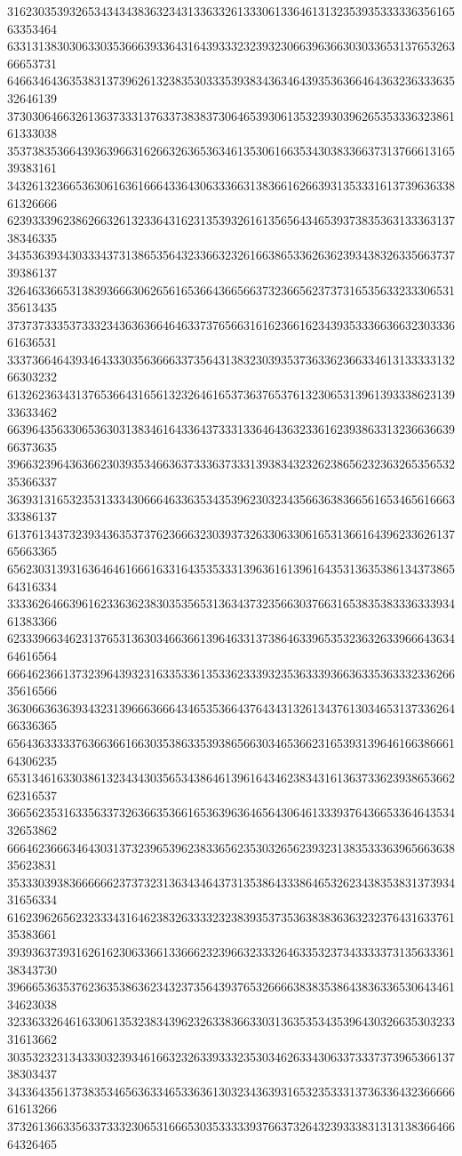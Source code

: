 31623035393265343434383632343133633261333061336461313235393533333635616563353464
63313138303063303536663933643164393332323932306639636630303365313765326366653731
64663464363538313739626132383530333539383436346439353636646436323633363532646139
37303064663261363733313763373838373064653930613532393039626535333632386161333038
35373835366439363966316266326365363461353061663534303833663731376661316539383161
34326132366536306163616664336430633366313836616266393135333161373963633861326666
62393339623862663261323364316231353932616135656434653937383536313336313738346335
34353639343033343731386535643233663232616638653362636239343832633566373739386137
32646336653138393666306265616536643665663732366562373731653563323330653135613435
37373733353733323436363664646337376566316162366162343935333663663230333661636531
33373664643934643330356366633735643138323039353736336236633461313333313266303232
61326236343137653664316561323264616537363765376132306531396139333862313933633462
66396435633065363031383461643364373331336464363233616239386331323663663966373635
39663239643636623039353466363733363733313938343232623865623236326535653235366337
36393131653235313334306664633635343539623032343566363836656165346561666333386137
61376134373239343635373762366632303937326330633061653136616439623362613765663365
65623031393163646461666163316435353331396361613961643531363538613437386564316334
33336264663961623363623830353565313634373235663037663165383538333633393461383366
62333966346231376531363034663661396463313738646339653532363263396664363464616564
66646236613732396439323163353361353362333932353633393663633536333233626635616566
36306636363934323139666366643465353664376434313261343761303465313733626466336365
65643633333763663661663035386335393865663034653662316539313964616638666164306235
65313461633038613234343035653438646139616434623834316136373362393865366262316537
36656235316335633732636635366165363963646564306461333937643665336464353432653862
66646236663464303137323965396238336562353032656239323138353336396566363835623831
35333039383666666237373231363434643731353864333864653262343835383137393431656334
61623962656232333431646238326333323238393537353638383636323237643163376135383661
39393637393162616230633661336662323966323332646335323734333337313563336138343730
39666536353762363538636234323735643937653266663838353864383633653064346134623038
32336332646163306135323834396232633836633031363535343539643032663530323331613662
30353232313433303239346166323263393332353034626334306337333737396536613738303437
34336435613738353465636334653363613032343639316532353331373633643236666661613266
37326136633563373332306531666530353333393766373264323933383131313836646664326465

